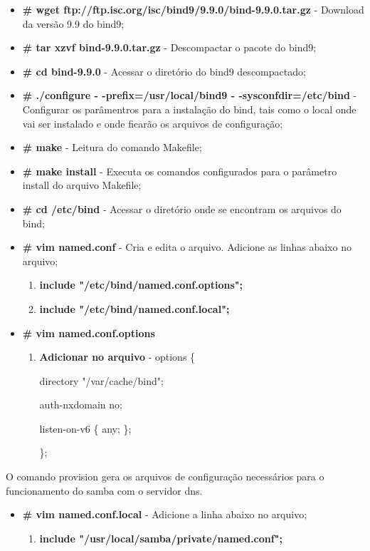 \begin{itemize}
	\item \textbf{\# wget ftp://ftp.isc.org/isc/bind9/9.9.0/bind-9.9.0.tar.gz} - Download da versão 9.9 do bind9;
	\item \textbf{\# tar xzvf bind-9.9.0.tar.gz} - Descompactar o pacote do bind9;
	\item \textbf{\# cd bind-9.9.0} - Acessar o diretório do bind9 descompactado;
	\item \textbf{\# ./configure - -prefix=/usr/local/bind9 - -sysconfdir=/etc/bind} - Configurar os parâmentros para a instalação do bind, tais como o local onde vai ser instalado e onde ficarão os arquivos de configuração;
	\item \textbf{\# make} - Leitura do comando Makefile;
	\item \textbf{\# make install} - Executa os comandos configurados para o parâmetro install do arquivo Makefile;
	\item \textbf{\# cd /etc/bind} - Acessar o diretório onde se encontram os arquivos do bind;
	\item \textbf{\# vim named.conf} - Cria e edita o arquivo. Adicione as linhas abaixo no arquivo;
		\begin{enumerate}
			\item \textbf{include "/etc/bind/named.conf.options";}
			\item \textbf{include "/etc/bind/named.conf.local";}
		\end{enumerate}
 		\item \textbf{\# vim named.conf.options}
			\begin{enumerate}
				\item \textbf{Adicionar no arquivo} - options \{
        			
					directory "/var/cache/bind";

					auth-nxdomain no;

					listen-on-v6 \{ any; \};
					
					\};
			\end{enumerate}
\end{itemize}

O comando provision gera os arquivos de configuração necessários para o funcionamento do samba com o servidor dns.

\begin{itemize}
	\item \textbf{\# vim named.conf.local} -  Adicione a linha abaixo no arquivo;
		\begin{enumerate}
			\item \textbf{include "/usr/local/samba/private/named.conf";}
		\end{enumerate}
\end{itemize}

